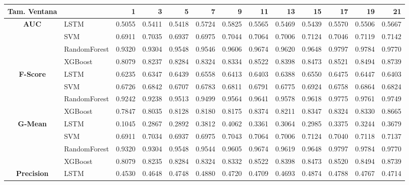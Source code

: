 \begin{table}[h]
	\centering
	\begin{adjustbox}{max width=15cm}
		\begin{tabular}{|c|l|r|r|r|r|r|r|r|r|r|r|r|}
			\hline
			\textbf{Tam. Ventana}&         &      1  &      3  &      5  &      7  &      9  &      11 &      13 &      15 &      17 &      19 &      21 \\
			\hline
			\textbf{AUC} & LSTM &  0.5055 &  0.5411 &  0.5418 &  0.5724 &  0.5825 &  0.5565 &  0.5469 &  0.5439 &  0.5570 &  0.5506 &  0.5667 \\
			& SVM &  0.6911 &  0.7035 &  0.6937 &  0.6975 &  0.7044 &  0.7064 &  0.7006 &  0.7124 &  0.7046 &  0.7119 &  0.7142 \\
			& RandomForest &  0.9320 &  0.9304 &  0.9548 &  0.9546 &  0.9606 &  0.9674 &  0.9620 &  0.9648 &  0.9797 &  0.9784 &  0.9770 \\
			& XGBoost &  0.8079 &  0.8237 &  0.8284 &  0.8324 &  0.8334 &  0.8522 &  0.8398 &  0.8473 &  0.8521 &  0.8494 &  0.8739 \\
			\hline
			\textbf{F-Score} & LSTM &  0.6235 &  0.6347 &  0.6439 &  0.6558 &  0.6413 &  0.6403 &  0.6388 &  0.6550 &  0.6475 &  0.6447 &  0.6403 \\
			& SVM &  0.6726 &  0.6842 &  0.6707 &  0.6783 &  0.6811 &  0.6791 &  0.6775 &  0.6924 &  0.6758 &  0.6864 &  0.6824 \\
			& RandomForest &  0.9242 &  0.9238 &  0.9513 &  0.9499 &  0.9564 &  0.9641 &  0.9578 &  0.9618 &  0.9775 &  0.9761 &  0.9749 \\
			& XGBoost &  0.7847 &  0.8035 &  0.8128 &  0.8180 &  0.8175 &  0.8374 &  0.8211 &  0.8347 &  0.8324 &  0.8330 &  0.8665 \\
			\hline
			\textbf{G-Mean} & LSTM &  0.1045 &  0.2867 &  0.2892 &  0.3812 &  0.4062 &  0.3361 &  0.3064 &  0.2985 &  0.3375 &  0.3244 &  0.3679 \\
			& SVM &  0.6911 &  0.7034 &  0.6937 &  0.6975 &  0.7043 &  0.7064 &  0.7006 &  0.7124 &  0.7040 &  0.7118 &  0.7137 \\
			& RandomForest &  0.9320 &  0.9304 &  0.9548 &  0.9544 &  0.9605 &  0.9674 &  0.9619 &  0.9648 &  0.9797 &  0.9784 &  0.9770 \\
			& XGBoost &  0.8079 &  0.8235 &  0.8284 &  0.8324 &  0.8332 &  0.8522 &  0.8398 &  0.8473 &  0.8520 &  0.8494 &  0.8739 \\
			\hline
			\textbf{Precision} & LSTM &  0.4530 &  0.4648 &  0.4748 &  0.4880 &  0.4720 &  0.4709 &  0.4693 &  0.4874 &  0.4788 &  0.4767 &  0.4714 \\

\end{tabular}
\end{adjustbox}
\end{table}
